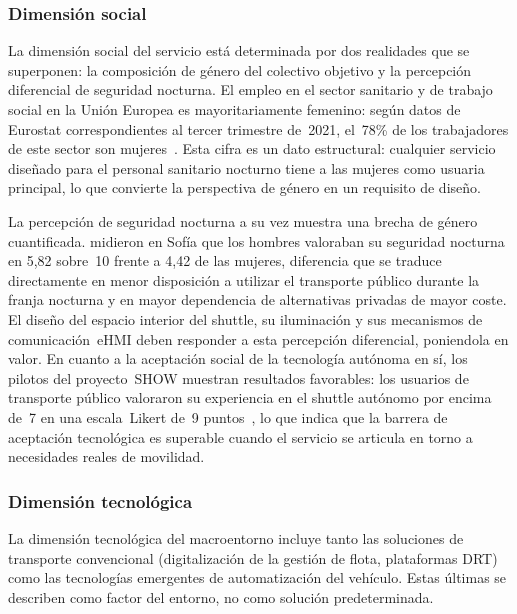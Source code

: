 \subsubsection{Dimensión social}
\label{sec:pestel-social}

La dimensión social del servicio está determinada por dos realidades que
se superponen: la composición de género del colectivo objetivo y la
percepción diferencial de seguridad nocturna. El empleo en el sector
sanitario y de trabajo social en la Unión Europea es mayoritariamente
femenino: según datos de Eurostat correspondientes al tercer trimestre
de~2021, el~78\% de los trabajadores de este sector son
mujeres~\parencite{Eurostat2022health}. Esta cifra es un dato estructural: 
cualquier servicio diseñado para el personal
sanitario nocturno tiene a las mujeres como usuaria principal, lo que
convierte la perspectiva de género en un requisito de diseño.

La percepción de seguridad nocturna a su vez muestra una brecha de género
cuantificada. \textcite{PlyushetvaBoussauw2020} midieron en Sofía que
los hombres valoraban su seguridad nocturna en 5,82 sobre~10 frente a
4,42 de las mujeres, diferencia que se traduce directamente en menor
disposición a utilizar el transporte público durante la franja nocturna y
en mayor dependencia de alternativas privadas de mayor coste. El diseño
del espacio interior del shuttle, su iluminación y sus mecanismos de
comunicación~eHMI deben responder a esta percepción diferencial, poniendola en valor.
En cuanto a la aceptación social de la tecnología autónoma en
sí, los pilotos del proyecto~SHOW muestran resultados favorables: los
usuarios de transporte público valoraron su experiencia en el shuttle
autónomo por encima de~7 en una escala~Likert de~9
puntos~\parencite{SHOW2024Legacy}, lo que indica que la barrera de
aceptación tecnológica es superable cuando el servicio se articula en
torno a necesidades reales de movilidad.

\subsubsection{Dimensión tecnológica}
\label{sec:pestel-tecnologica}

La dimensión tecnológica del macroentorno incluye tanto las soluciones de transporte convencional (digitalización de la gestión de flota, plataformas DRT) como las tecnologías emergentes de automatización del vehículo. Estas últimas se describen como factor del entorno, no como solución predeterminada.

